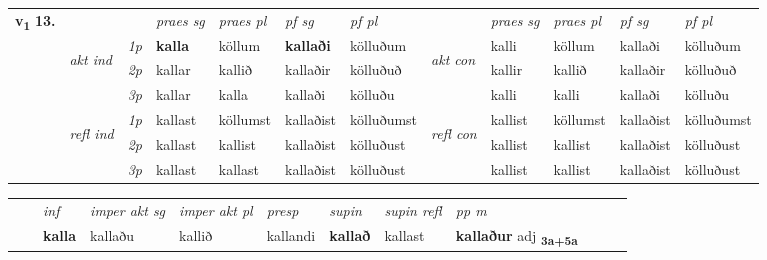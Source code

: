 \begin{tabular}{llllllllllll} \toprule
\multirow{4}{*}{{{\textbf{v{\textsubscript{1}}} \Large{\textbf{13.}}}}}  & &   &  \textit{praes sg}  & \textit{praes pl}  &\textit{ pf sg} & \textit{pf pl} &  &  \textit{praes sg}  & \textit{praes pl}  & \textit{pf sg} & \textit{pf pl } \\*
	\cmidrule{4-7} \cmidrule{9-12}
 & \multirow{3}{*}{\begin{turn}{90}\textit{akt ind}\end{turn}} & {\textit{1p}} & \textbf{kalla} & köllum    & \textbf{kallaði} & kölluðum & \multirow{3}{*}{\begin{turn}{90}\textit{akt con}\end{turn}} &kalli & köllum & kallaði & kölluðum\\*
& &  {\textit{2p}} &  kallar  & kallið   & kallaðir & kölluðuð & & kallir & kallið & kallaðir & kölluðuð \\*
& &  {\textit{3p}} & kallar & kalla   & kallaði & kölluðu & & kalli & kalli& kallaði & kölluðu  \\*
\cmidrule{4-7} \cmidrule{9-12}
 &\multirow{3}{*}{\begin{turn}{90}\textit{refl ind}\end{turn}} & {\textit{1p}} & kallast & köllumst    & kallaðist & kölluðumst & \multirow{3}{*}{\begin{turn}{90}\textit{refl con}\end{turn}}  &kallist & köllumst & kallaðist & kölluðumst\\*
 &&  {\textit{2p}} &  kallast  & kallist   & kallaðist & kölluðust & &kallist & kallist & kallaðist & kölluðust \\*
& &  {\textit{3p}} & kallast & kallast   & kallaðist & kölluðust & & kallist & kallist& kallaðist & kölluðust  \\*
\cmidrule{4-7} \cmidrule{9-12}
\end{tabular}


\begin{tabular}{llllllllllll}
 & & \textit{inf} & \textit{imper akt sg} & \textit{imper akt pl}   & \textit{presp} & \textit{supin} & \textit{supin refl} & \textit{pp m}     \\*
  & & \textbf{kalla} & kallaðu  & kallið   & kallandi &  \textbf{kallað} & kallast & \textbf{kallaður} adj \textbf{\textsubscript{3a+5a}} \\*
\cmidrule{1-12}
\end{tabular}



